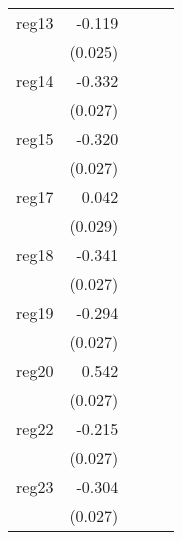 {\begin{longtable}{l*{4}{D{.}{.}{-1}}}
\addlinespace
reg13       &      -0.119\sym{***}&                     &                     &                     \\
            &     (0.025)         &                     &                     &                     \\
\addlinespace
reg14       &      -0.332\sym{***}&                     &                     &                     \\
            &     (0.027)         &                     &                     &                     \\
\addlinespace
reg15       &      -0.320\sym{***}&                     &                     &                     \\
            &     (0.027)         &                     &                     &                     \\
\addlinespace
reg17       &       0.042         &                     &                     &                     \\
            &     (0.029)         &                     &                     &                     \\
\addlinespace
reg18       &      -0.341\sym{***}&                     &                     &                     \\
            &     (0.027)         &                     &                     &                     \\
\addlinespace
reg19       &      -0.294\sym{***}&                     &                     &                     \\
            &     (0.027)         &                     &                     &                     \\
\addlinespace
reg20       &       0.542\sym{***}&                     &                     &                     \\
            &     (0.027)         &                     &                     &                     \\
\addlinespace
reg22       &      -0.215\sym{***}&                     &                     &                     \\
            &     (0.027)         &                     &                     &                     \\
\addlinespace
reg23       &      -0.304\sym{***}&                     &                     &                     \\
            &     (0.027)         &                     &                     &                     \\

\end{longtable}}
